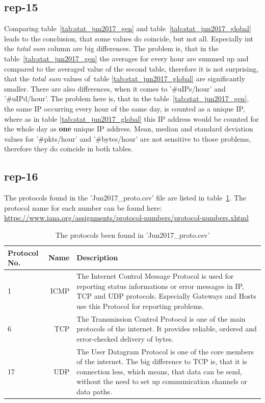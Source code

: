 \subsection*{rep-15}
Comparing table~\ref{tab:stat_jun2017_gen} and table~\ref{tab:stat_jun2017_global} leads to the conclusion, that some values do coincide, but not all. Especially int the \textit{total sum} column are big differences. The problem is, that in the table~\ref{tab:stat_jun2017_gen} the averages for every hour are summed up and compared to the averaged value of the second table, therefore it is not surprising, that the \textit{total sum} values of~table \ref{tab:stat_jun2017_global} are significantly smaller.
There are also differences, when it comes to '\#uIPs/hour' and '\#uIPd/hour'. The problem here is, that in the table~\ref{tab:stat_jun2017_gen}, the same IP occurring every hour of the same day, is counted as a unique IP, where as in table \ref{tab:stat_jun2017_global} this IP address would be counted for the whole day as \textbf{one} unique IP address.
Mean, median and standard deviation values for '\#pkts/hour' and '\#bytes/hour' are not sensitive to those problems, therefore they do coincide in both tables.

\subsection*{rep-16}
The protocols found in the 'Jun2017\_proto.csv' file are listed in table~\ref{tab:proto}. The protocol name for each number can be found here: \url{https://www.iana.org/assignments/protocol-numbers/protocol-numbers.xhtml}

\begin{table}[H]
\center
\begin{tabular}{lrp{5cm}}
\toprule
	Protocol No. & Name & Description \\
\midrule
	1 & ICMP & The Internet Control Message Protocol is used for reporting status informations or error messages in IP, TCP and UDP protocols. Especially Gateways and Hosts use this Protocol for reporting problems. \tablefootnote{\url{https://www.itwissen.info/ICMP-Internet-control-message-protocol-ICMP-Protokoll.html}}\\
	6 & TCP & The Transmission Control Protocol is one of the main protocols of the internet. It provides reliable, ordered and error-checked delivery of bytes. \tablefootnote{\url{https://en.wikipedia.org/wiki/Transmission_Control_Protocol}} \\
	17 & UDP & The User Datagram Protocol is one of the core members of the internet. The big difference to TCP is, that it is connection less, which means, that data can be send, without the need to set up communication channels or data paths. \tablefootnote{\url{https://en.wikipedia.org/wiki/User_Datagram_Protocol
}}\\
\bottomrule
\end{tabular}
\caption{ The protocols been found in 'Jun2017\_proto.csv' }
\label{tab:proto}
\end{table}

